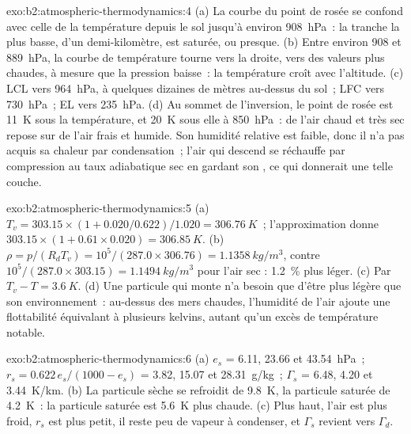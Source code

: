 \begin{solution}{exo:b2:atmospheric-thermodynamics:4}
(a) La courbe du point de rosée se confond avec celle de la température depuis le sol jusqu'à environ
\qty{908}{hPa}~: la tranche la plus basse, d'un demi-kilomètre, est saturée, ou presque. (b) Entre environ
908 et \qty{889}{hPa}, la courbe de température tourne vers la droite, vers des valeurs plus chaudes,
à mesure que la pression baisse~: la température croît avec l'altitude. (c) LCL vers \qty{964}{hPa}, à
quelques dizaines de mètres au-dessus du sol~; LFC vers \qty{730}{hPa}~; EL vers \qty{235}{hPa}. (d) Au
sommet de l'inversion, le point de rosée est \qty{11}{K} sous la température, et \qty{20}{K} sous elle
à \qty{850}{hPa}~: de l'air chaud et très sec repose sur de l'air frais et humide. Son humidité relative
est faible, donc il n'a pas acquis sa chaleur par condensation~; l'air qui descend se réchauffe par
compression au taux adiabatique sec en gardant son , ce qui donnerait une telle couche.
\end{solution}

\begin{solution}{exo:b2:atmospheric-thermodynamics:5}
(a) $T_v = 303.15 \times (1 + 0.020/0.622)/1.020 = \qty{306.76}{K}$~; l'approximation donne
$303.15 \times (1 + 0.61 \times 0.020) = \qty{306.85}{K}$. (b) $\rho = p/(R_dT_v) = 10^5/(287.0
\times 306.76) = \qty{1.1358}{kg/m^3}$, contre $10^5/(287.0 \times 303.15) =
\qty{1.1494}{kg/m^3}$ pour l'air sec : \qty{1.2}{\percent} plus léger. (c) Par $T_v - T =
\qty{3.6}{K}$. (d) Une particule qui monte n'a besoin que d'être plus légère que son
environnement~: au-dessus des mers chaudes, l'humidité de l'air ajoute une
flottabilité équivalant à plusieurs kelvins, autant qu'un excès de température notable.
\end{solution}

\begin{solution}{exo:b2:atmospheric-thermodynamics:6}
(a) $e_s$ = 6.11, 23.66 et \qty{43.54}{hPa}~; $r_s = 0.622\,e_s/(1000 - e_s)$ = 3.82,
15.07 et \qty{28.31}{g/kg}~; $\Gamma_s$ = 6.48, 4.20 et \qty{3.44}{K/km}. (b) La particule
sèche se refroidit de \qty{9.8}{K}, la particule saturée de \qty{4.2}{K}~: la particule
saturée est \qty{5.6}{K} plus chaude. (c) Plus haut, l'air est plus froid, $r_s$ est
plus petit, il reste peu de vapeur à condenser, et $\Gamma_s$ revient vers $\Gamma_d$.
\end{solution}

